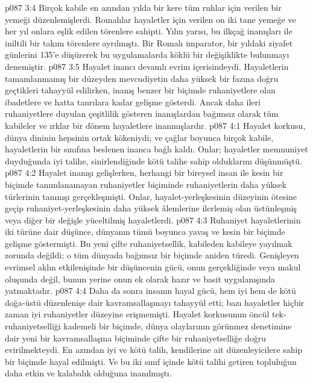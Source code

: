 \vs p087 3:4 Birçok kabile en azından yılda bir kere tüm ruhlar için verilen bir yemeği düzenlemişlerdi. Romalılar hayaletler için verilen on iki tane yemeğe ve her yıl onlara eşlik edilen törenlere sahipti. Yılın yarısı, bu ilkçağ inanışları ile iniltili bir takım törenlere ayrılmıştı. Bir Romalı imparator, bir yıldaki ziyafet günlerini 135’e düşürerek bu uygulamalarda köklü bir değişiklikte bulunmayı denemiştir.
\vs p087 3:5 Hayalet inancı devamlı evrim içerisindeydi. Hayaletlerin tamamlanmamış bir düzeyden mevcudiyetin daha yüksek bir fazına doğru geçtikleri tahayyül edilirken, inanış benzer bir biçimde ruhaniyetlere olan ibadetlere ve hatta tanrılara kadar gelişme gösterdi. Ancak daha ileri ruhaniyetlere duyulan çeşitlilik gösteren inanışlardan bağımsız olarak tüm kabileler ve ırklar bir dönem hayaletlere inanmışlardır.
\vs p087 4:1 Hayalet korkusu, dünya dininin hepsinin ortak kökeniydi; ve çağlar boyunca birçok kabile, hayaletlerin bir sınıfına beslenen inanca bağlı kaldı. Onlar; hayaletler memnuniyet duyduğunda iyi talihe, sinirlendiğinde kötü talihe sahip olduklarını düşünmüştü.
\vs p087 4:2 Hayalet inanışı gelişlerken, herhangi bir bireysel insan ile kesin bir biçimde tanımlanamayan ruhaniyetler biçiminde ruhaniyetlerin daha yüksek türlerinin tanınışı gerçekleşmişti. Onlar, hayalet\hyp{}yerleşkesinin düzeyinin ötesine geçip ruhaniyet\hyp{}yerleşkesinin daha yüksek âlemlerine ilerlemiş olan üstünleşmiş veya diğer bir değişle yüceltilmiş hayaletlerdi.
\vs p087 4:3 Ruhaniyet hayaletlerinin iki türüne dair düşünce, dünyanın tümü boyunca yavaş ve kesin bir biçimde gelişme göstermişti. Bu yeni çifte ruhaniyetsellik, kabileden kabileye yayılmak zorunda değildi; o tüm dünyada bağımsız bir biçimde aniden türedi. Genişleyen evrimsel aklın etkilenişinde bir düşüncenin gücü, onun gerçekliğinde veya makul oluşunda değil, bunun yerine onun  ek olarak hazır ve basit uygulanışında yatmaktadır.
\vs p087 4:4 Daha da sonra insanın hayal gücü, hem iyi hem de kötü doğa\hyp{}üstü düzenlenişe dair kavramsallaşmayı tahayyül etti; bazı hayaletler hiçbir zaman iyi ruhaniyetler düzeyine erişmemişti. Hayalet korkusunun öncül tek\hyp{}ruhaniyetselliği kademeli bir biçimde, dünya olaylarının görünmez denetimine dair yeni bir kavramsallaşma biçiminde çifte bir ruhaniyetselliğe doğru evirilmekteydi. En azından iyi ve kötü talih, kendilerine ait düzenleyicilere sahip bir biçimde hayal edilmişti. Ve bu iki sınıf içinde kötü talihi getiren topluluğun daha etkin ve kalabalık olduğuna inanılmıştı.
